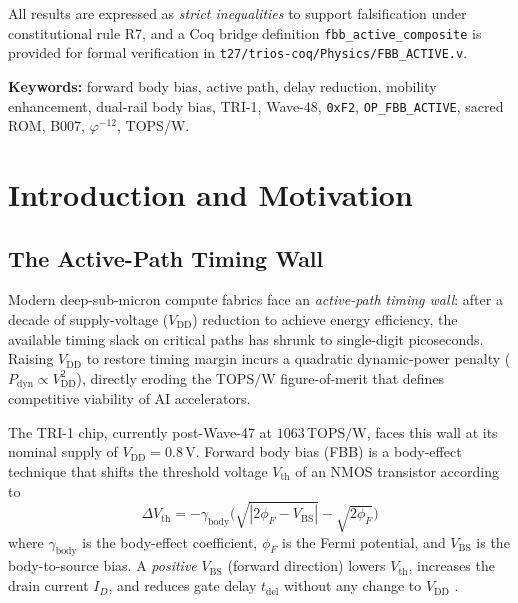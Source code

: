 \documentclass[12pt,a4paper]{report}
\theoremstyle{plain}
\theoremstyle{definition}
\theoremstyle{remark}
\newcommand{\opcode}[1]{\texttt{#1}}
\newcommand{\vdd}{V_{\mathrm{DD}}}
\newcommand{\topsw}{\mathrm{TOPS/W}}
\newcommand{\tdel}{t_{\mathrm{del}}}
\begin{document}
All results are expressed as \emph{strict inequalities} to support falsification under
constitutional rule R7, and a Coq bridge definition \texttt{fbb\_active\_composite} is provided
for formal verification in \texttt{t27/trios-coq/Physics/FBB\_ACTIVE.v}.

\bigskip
\noindent\textbf{Keywords:} forward body bias, active path, delay reduction, mobility enhancement,
dual-rail body bias, TRI-1, Wave-48, \opcode{0xF2}, \opcode{OP\_FBB\_ACTIVE}, sacred ROM, B007,
$\varphi^{-12}$, TOPS/W.

\section{Introduction and Motivation}
\label{sec:introduction}

\subsection{The Active-Path Timing Wall}

Modern deep-sub-micron compute fabrics face an \emph{active-path timing wall}: after a decade of
supply-voltage ($\vdd$) reduction to achieve energy efficiency, the available timing slack on
critical paths has shrunk to single-digit picoseconds.  Raising $\vdd$ to restore timing margin
incurs a quadratic dynamic-power penalty ($P_{\mathrm{dyn}} \propto \vdd^{2}$), directly eroding
the $\topsw$ figure-of-merit that defines competitive viability of AI accelerators.

The TRI-1 chip, currently post-Wave-47 at $1063\,\topsw$, faces this wall at its nominal supply
of $\vdd = 0.8\,\mathrm{V}$.  Forward body bias (FBB) is a body-effect technique that shifts the
threshold voltage $V_{\mathrm{th}}$ of an NMOS transistor according to
\begin{equation}
  \Delta V_{\mathrm{th}} = -\gamma_{\mathrm{body}} \bigl(\sqrt{|2\phi_{F} - V_{\mathrm{BS}}|}
    - \sqrt{2\phi_{F}}\bigr)
  \label{eq:body_effect}
\end{equation}
where $\gamma_{\mathrm{body}}$ is the body-effect coefficient, $\phi_{F}$ is the Fermi potential,
and $V_{\mathrm{BS}}$ is the body-to-source bias.  A \emph{positive} $V_{\mathrm{BS}}$ (forward
direction) lowers $V_{\mathrm{th}}$, increases the drain current $I_{D}$, and reduces gate delay
$\tdel$ without any change to $\vdd$ \citep{tschanz_jssc_2002}.
\end{document}
